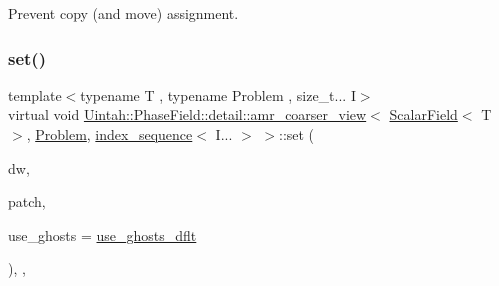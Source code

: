 Prevent copy (and move) assignment. 

\mbox{\label{classUintah_1_1PhaseField_1_1detail_1_1amr__coarser__view_3_01ScalarField_3_01T_01_4_00_01Proble9cadea116dab5bdb44bb3e29abbe99ef_abe4876f94a9c77e38b7c3d434f86b3c0}} 
\subsubsection{\texorpdfstring{set()}{set()}\hspace{0.1cm}{\footnotesize\ttfamily [1/2]}}
{\footnotesize\ttfamily template$<$typename T , typename Problem , size\+\_\+t... I$>$ \\
virtual void \hyperlink{classUintah_1_1PhaseField_1_1detail_1_1amr__coarser__view}{Uintah\+::\+Phase\+Field\+::detail\+::amr\+\_\+coarser\+\_\+view}$<$ \hyperlink{structUintah_1_1PhaseField_1_1ScalarField}{Scalar\+Field}$<$ T $>$, \hyperlink{classUintah_1_1PhaseField_1_1Problem}{Problem}, \hyperlink{namespaceUintah_1_1PhaseField_a237de804d99512e50613aff7c94a9461}{index\+\_\+sequence}$<$ I... $>$ $>$\+::set (\begin{DoxyParamCaption}\item[{Data\+Warehouse $\ast$}]{dw,  }\item[{const Patch $\ast$}]{patch,  }\item[{bool}]{use\+\_\+ghosts = {\ttfamily \hyperlink{classUintah_1_1PhaseField_1_1detail_1_1amr__coarser__view_3_01ScalarField_3_01T_01_4_00_01Proble9cadea116dab5bdb44bb3e29abbe99ef_ace77967592bbb525ac1e29555bb317cd}{use\+\_\+ghosts\+\_\+dflt}} }\end{DoxyParamCaption})\hspace{0.3cm}{\ttfamily [inline]}, {\ttfamily [override]}, {\ttfamily [virtual]}}



